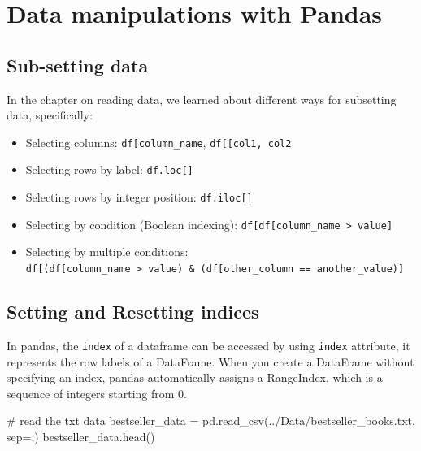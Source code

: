 \documentclass[
  letterpaper,
  DIV=11,
  numbers=noendperiod]{scrreprt}
\newenvironment{Shaded}{\begin{snugshade}}{\end{snugshade}}
\newcommand{\CommentTok}[1]{\textcolor[rgb]{0.37,0.37,0.37}{#1}}
\newcommand{\NormalTok}[1]{\textcolor[rgb]{0.00,0.23,0.31}{#1}}
\newcommand{\OperatorTok}[1]{\textcolor[rgb]{0.37,0.37,0.37}{#1}}
\newcommand{\StringTok}[1]{\textcolor[rgb]{0.13,0.47,0.30}{#1}}
\providecommand{\tightlist}{%
  \setlength{\itemsep}{0pt}\setlength{\parskip}{0pt}}\usepackage{longtable,booktabs,array}
\begin{document}
\hypertarget{data-manipulations-with-pandas}{%
\section{Data manipulations with
Pandas}\label{data-manipulations-with-pandas}}

\hypertarget{sub-setting-data}{%
\subsection{Sub-setting data}\label{sub-setting-data}}

In the chapter on reading data, we learned about different ways for
subsetting data, specifically:

\begin{itemize}
\tightlist
\item
  Selecting columns:
  \texttt{df{[}\textquotesingle{}column\_name\textquotesingle{}{]}},
  \texttt{df{[}{[}\textquotesingle{}col1\textquotesingle{},\ \textquotesingle{}col2\textquotesingle{}{]}{]}}
\item
  Selecting rows by label: \texttt{df.loc{[}{]}}
\item
  Selecting rows by integer position: \texttt{df.iloc{[}{]}}
\item
  Selecting by condition (Boolean indexing):
  \texttt{df{[}df{[}\textquotesingle{}column\_name\textquotesingle{}{]}\ \textgreater{}\ value{]}}
\item
  Selecting by multiple conditions:
  \texttt{df{[}(df{[}\textquotesingle{}column\_name\textquotesingle{}{]}\ \textgreater{}\ value)\ \&\ (df{[}\textquotesingle{}other\_column\textquotesingle{}{]}\ ==\ another\_value){]}}
\end{itemize}

\hypertarget{setting-and-resetting-indices}{%
\subsection{Setting and Resetting
indices}\label{setting-and-resetting-indices}}

In pandas, the \texttt{index} of a dataframe can be accessed by using
\texttt{index} attribute, it represents the row labels of a DataFrame.
When you create a DataFrame without specifying an index, pandas
automatically assigns a RangeIndex, which is a sequence of integers
starting from 0.

\begin{Shaded}
\begin{Highlighting}[]
\CommentTok{\# read the txt data}
\NormalTok{bestseller\_data }\OperatorTok{=}\NormalTok{ pd.read\_csv(}\StringTok{\textquotesingle{}../Data/bestseller\_books.txt\textquotesingle{}}\NormalTok{, sep}\OperatorTok{=}\StringTok{\textquotesingle{};\textquotesingle{}}\NormalTok{)}
\NormalTok{bestseller\_data.head()}
\end{Highlighting}
\end{Shaded}
\end{document}
